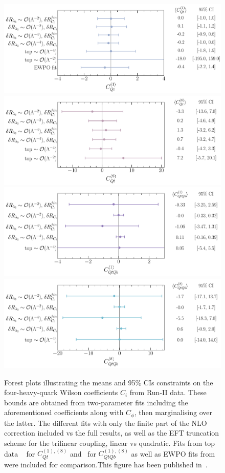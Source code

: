 \begin{figure}[htpb!]
	\vspace*{-0.5cm}
	\begin{center}
		\includegraphics[width=0.75\linewidth]{fig/uebeblick_Cqt1}
		\includegraphics[width=0.75\linewidth]{fig/uebeblick_Cqt8} 
		\includegraphics[width=0.75\linewidth]{fig/uebeblick_Cqtqb1}
		\includegraphics[width=0.75\linewidth]{fig/uebeblick_Cqtqb8}
	\end{center}
	\vspace*{-0.5cm}
	\caption{Forest plots illustrating the means and 95\% CIs constraints on the four-heavy-quark Wilson coefficients $C_i$ from Run-II data. These bounds are obtained from two-parameter fits including the aforementioned coefficients along with $C_\phi$, then marginalising over the latter. The different fits with only the finite part of the NLO correction included vs the full results, as well as the EFT truncation scheme for the trilinear coupling, linear vs quadratic. Fits from top data ~\cite{Ethier:2021bye} for $C_{Qt}^{(1),(8)}$ and~\cite{Hartland:2019bjb} for $C_{QtQb}^{(1),(8)}$ as well as EWPO fits from~\cite{Dawson:2022bxd} were included for comparison.This figure has been published in~\cite{Alasfar:2022zyr}.}
		\label{fig:summ4f}
\end{figure}
